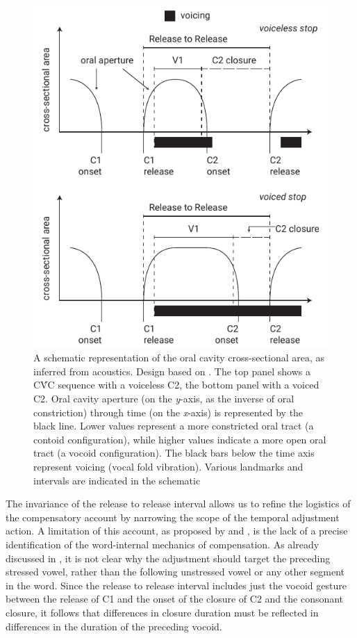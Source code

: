 \documentclass[charis]{glossa}
\begin{document}
\begin{figure}
  \centering
  \includegraphics{img/Figure6.pdf}
  \caption{A schematic representation of the oral cavity cross-sectional area, as inferred from acoustics. Design based on \citet{esposito2002}. The top panel shows a CV́C sequence with a voiceless C2, the bottom panel with a voiced C2. Oral cavity aperture (on the \textit{y}-axis, as the inverse of oral constriction) through time (on the \textit{x}-axis) is represented by the black line. Lower values represent a more constricted oral tract (a contoid configuration), while higher values indicate a more open oral tract (a vocoid configuration). The black bars below the time axis represent voicing (vocal fold vibration). Various landmarks and intervals are indicated in the schematic}
  \label{f:compensatory}
\end{figure}

The invariance of the release to release interval allows us to refine
the logistics of the compensatory account by narrowing the scope of the
temporal adjustment action. A limitation of this account, as proposed by
\citet{slis1969} and \citet{lehiste1970}, is the lack of a precise
identification of the word-internal mechanics of compensation. As
already discussed in , it is not clear why the adjustment
should target the preceding stressed vowel, rather than the following
unstressed vowel or any other segment in the word. Since the release to
release interval includes just the vocoid gesture between the release of
C1 and the onset of the closure of C2 and the consonant closure, it
follows that differences in closure duration must be reflected in
differences in the duration of the preceding vocoid.
\end{document}
